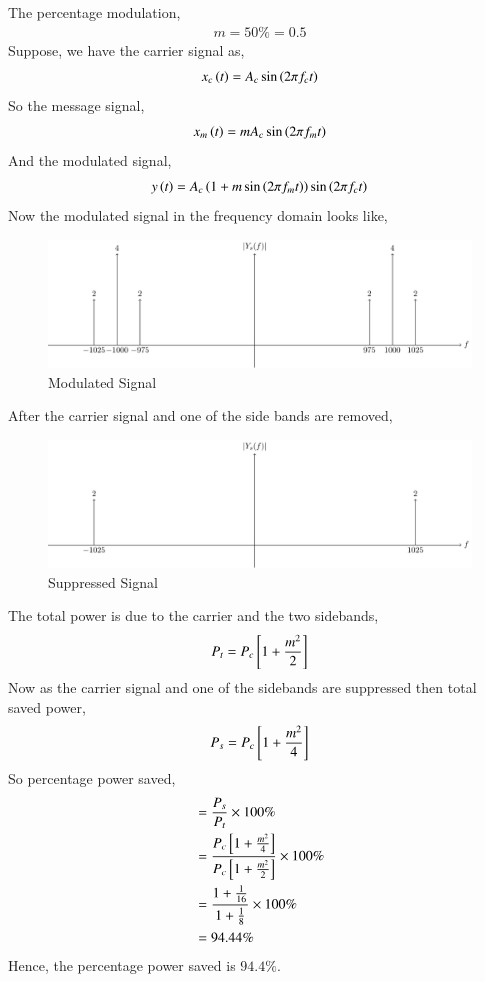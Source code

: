 \documentclass[journal,12pt,twocolumn]{IEEEtran}
\theoremstyle{remark}
\begin{document}
\solution
\fi

The percentage modulation,
\begin{align}
    m=50\%=0.5
\end{align}
Suppose, we have the carrier signal as,
\begin{align}
    x_c\left(t\right)=A_c\sin{\ensuremath{\left(2\pi f_ct\right)}}
\end{align}
So the message signal,
\begin{align}
    x_m\left(t\right)=mA_c\sin{\ensuremath{\left(2\pi f_mt\right)}}
\end{align}
And the modulated signal,
\begin{align}
    y\left(t\right)=A_c\left(1+m\sin{\ensuremath{\left(2\pi f_mt\right)}}\right)\sin{\ensuremath{\left(2\pi f_ct\right)}}
\end{align}
Now the modulated signal in the frequency domain looks like,
\begin{figure}[h!]
    \centering
    \includegraphics[width=\columnwidth]{2021/EC/22/figs/modulated.pdf}
    \caption{Modulated Signal}
\end{figure}
After the carrier signal and one of the side bands are removed,
\begin{figure}[h!]
    \centering
    \includegraphics[width=\columnwidth]{2021/EC/22/figs/suppressed.pdf}
    \caption{Suppressed Signal}
\end{figure}
The total power is due to the carrier and the two sidebands,
\begin{align}
    P_t=P_c{}\left[1+\frac{m^2}{2}\right]
\end{align}
Now as the carrier signal and one of the sidebands are suppressed then total saved power,
\begin{align}
    P_s=P_c{}\left[1+\frac{m^2}{4}\right]
\end{align}
So percentage power saved,
\begin{align}
    &=\frac{P_s}{P_t}\times100\% \\
    &=\frac{P_c{}\left[1+\frac{m^2}{4}\right]}{P_c{}\left[1+\frac{m^2}{2}\right]}\times100\% \\
    &=\frac{1+\frac{1}{16}}{1+\frac{1}{8}}\times100\% \\
    &=94.44\%
\end{align}
Hence, the percentage power saved is $94.4\%$.
\end{document}
